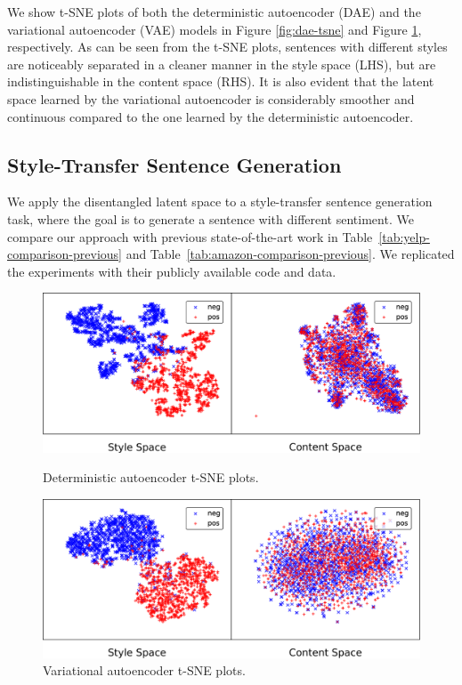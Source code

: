\documentclass[letterpaper]{article} %
\begin{document}
We show t-SNE plots of both the deterministic autoencoder (DAE) and the variational autoencoder (VAE) models in Figure \ref{fig:dae-tsne} and Figure \ref{fig:vae-tsne}, respectively.
As can be seen from the t-SNE plots, sentences with different styles are noticeably separated in a cleaner manner in the style space (LHS), but are indistinguishable in the content space (RHS).
It is also evident that the latent space learned by the variational autoencoder is considerably smoother and continuous compared to the one learned by the deterministic autoencoder.


\subsection{Style-Transfer Sentence Generation}

We apply the disentangled latent space to a style-transfer sentence generation task, where the goal is to generate a sentence with different sentiment.
We compare our approach with previous state-of-the-art work in Table~\ref{tab:yelp-comparison-previous} and Table~\ref{tab:amazon-comparison-previous}.
We replicated the experiments with their publicly available code and data.

\begin{figure}[ht]
	\captionsetup{justification=centering}

	\includegraphics[width=\linewidth]{dae-latent-spaces}
	\caption{Deterministic autoencoder t-SNE plots.}
	\label{fig:dae-tsne}

	\includegraphics[width=\linewidth]{vae-latent-spaces}
	\caption{Variational autoencoder t-SNE plots.}
	\label{fig:vae-tsne}
\end{figure}
\end{document}
